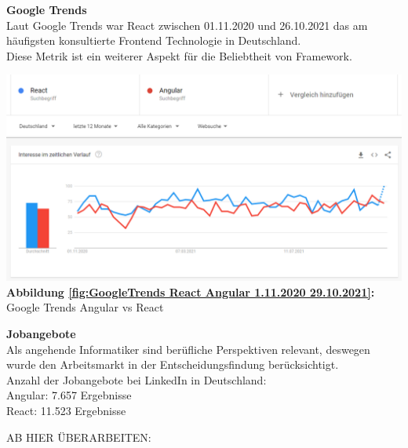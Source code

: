 \newpage

\begin{flushleft}
\textbf{Google Trends}\\
Laut Google Trends war React zwischen 01.11.2020 und 26.10.2021 das am häufigsten konsultierte Frontend Technologie in Deutschland.
\\
Diese Metrik ist ein weiterer Aspekt für die Beliebtheit von Framework.
\end{flushleft}

\begin{center}
  \includegraphics[scale=0.5]
  {sources/GoogleTrends React Angular 1.11.2020 29.10.2021}\label{fig:GoogleTrends React Angular 1.11.2020 29.10.2021}\\
  \textbf{Abbildung \autoref{fig:GoogleTrends React Angular 1.11.2020 29.10.2021}:} Google Trends Angular vs React
    {\cite{GO01}}
\end{center}

\begin{flushleft}
\textbf{Jobangebote}\\
Als angehende Informatiker sind berüfliche Perspektiven relevant, deswegen wurde den Arbeitsmarkt in der Entscheidungsfindung berücksichtigt.
\\
  Anzahl der Jobangebote bei LinkedIn in Deutschland:
  \\
  Angular: 7.657 Ergebnisse{\cite{LI1}}
  \\
  React: 11.523 Ergebnisse{\cite{LI2}}
\end{flushleft}
AB HIER ÜBERARBEITEN:

